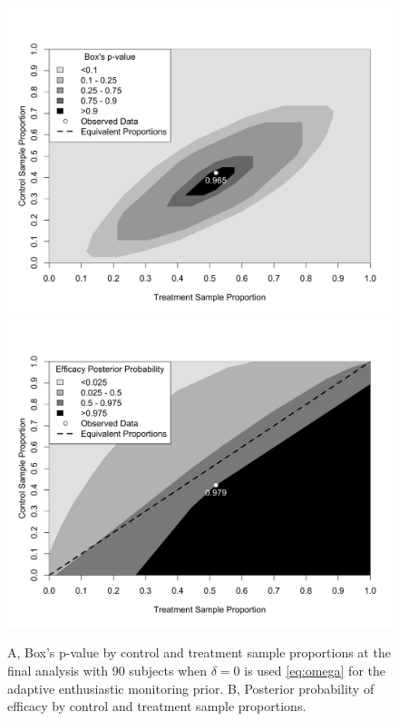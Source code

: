 \documentclass[AMA,STIX1COL,doublespace]{WileyNJD-v2}
\begin{document}
\begin{figure}
\begin{center}
   \includegraphics[width=5.5in]{2dbayesp.png}
    \includegraphics[width=5.5in]{2dpostp.png}
    \caption{A, Box's p-value by control and treatment sample proportions at the final analysis with 90 subjects when $\delta=0$ is used \eqref{eq:omega} for the adaptive enthusiastic monitoring prior. B, Posterior probability of efficacy by control and treatment sample proportions.}
\label{fig:2dheatmaps}
 \end{center}
\end{figure}
\end{document}
